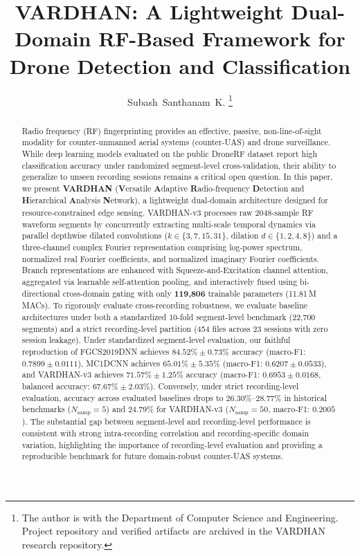 \documentclass[journal,10pt,twocolumn]{IEEEtran}
\begin{document}
\title{VARDHAN: A Lightweight Dual-Domain RF-Based Framework for Drone Detection and Classification}

\author{Subash~Santhanam~K.
\thanks{The author is with the Department of Computer Science and Engineering. Project repository and verified artifacts are archived in the VARDHAN research repository.}%
}

\maketitle

\begin{abstract}
Radio frequency (RF) fingerprinting provides an effective, passive, non-line-of-sight modality for counter-unmanned aerial systems (counter-UAS) and drone surveillance. While deep learning models evaluated on the public DroneRF dataset report high classification accuracy under randomized segment-level cross-validation, their ability to generalize to unseen recording sessions remains a critical open question. In this paper, we present \textbf{VARDHAN} (\textbf{V}ersatile \textbf{A}daptive \textbf{R}adio-frequency \textbf{D}etection and \textbf{H}ierarchical \textbf{A}nalysis \textbf{N}etwork), a lightweight dual-domain architecture designed for resource-constrained edge sensing. VARDHAN-v3 processes raw 2048-sample RF waveform segments by concurrently extracting multi-scale temporal dynamics via parallel depthwise dilated convolutions ($k \in \{3, 7, 15, 31\}$, dilation $d \in \{1, 2, 4, 8\}$) and a three-channel complex Fourier representation comprising log-power spectrum, normalized real Fourier coefficients, and normalized imaginary Fourier coefficients. Branch representations are enhanced with Squeeze-and-Excitation channel attention, aggregated via learnable self-attention pooling, and interactively fused using bi-directional cross-domain gating with only \textbf{119,806} trainable parameters (11.81\,M MACs). To rigorously evaluate cross-recording robustness, we evaluate baseline architectures under both a standardized 10-fold segment-level benchmark (22,700 segments) and a strict recording-level partition (454 files across 23 sessions with zero session leakage). Under standardized segment-level evaluation, our faithful reproduction of FGCS2019DNN achieves $84.52\% \pm 0.73\%$ accuracy (macro-F1: $0.7899 \pm 0.0111$), MC1DCNN achieves $65.01\% \pm 5.35\%$ (macro-F1: $0.6207 \pm 0.0533$), and VARDHAN-v3 achieves $71.57\% \pm 1.25\%$ accuracy (macro-F1: $0.6953 \pm 0.0168$, balanced accuracy: $67.67\% \pm 2.03\%$). Conversely, under strict recording-level evaluation, accuracy across evaluated baselines drops to $26.30\%\text{--}28.77\%$ in historical benchmarks ($N_{\text{samp}}=5$) and $24.79\%$ for VARDHAN-v3 ($N_{\text{samp}}=50$, macro-F1: $0.2005$). The substantial gap between segment-level and recording-level performance is consistent with strong intra-recording correlation and recording-specific domain variation, highlighting the importance of recording-level evaluation and providing a reproducible benchmark for future domain-robust counter-UAS systems.
\end{abstract}
\end{document}
